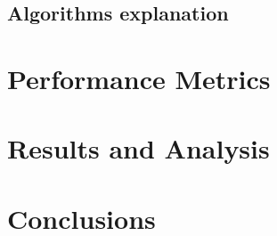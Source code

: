 \documentclass{article}
\begin{document}
\subsection{Algorithms explanation}


\section{Performance Metrics}


\section{Results and Analysis}


\section{Conclusions}

\end{document}
